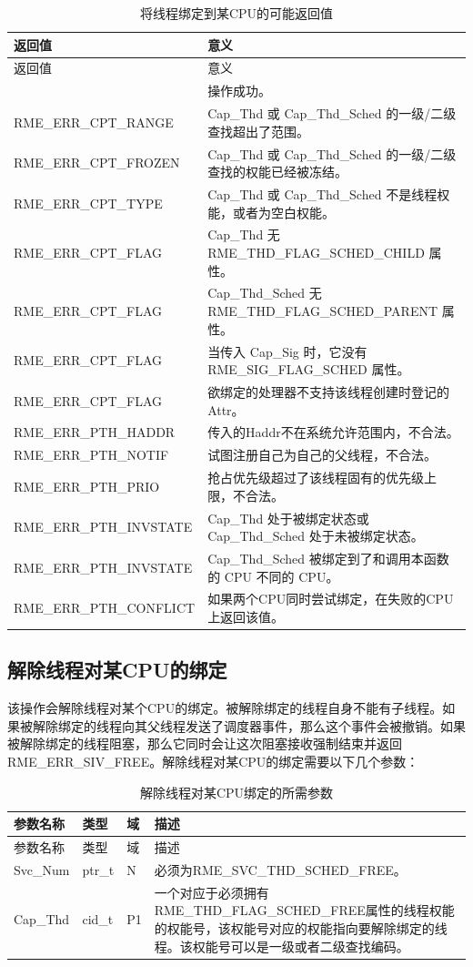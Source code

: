 \begin{xltabular}{\textwidth}{@{}>{\hsize\raggedright\arraybackslash}X>{\hsize\raggedright\arraybackslash}X@{}}
\caption{将线程绑定到某CPU的可能返回值}\label{tab:4-25-bind-thread-to-cpu-return-values}\\
\toprule
返回值 & 意义\tabularnewline
\endfirsthead
\toprule
返回值 & 意义\tabularnewline
\midrule
\endhead
\bottomrule
{} & 操作成功。\tabularnewline
    RME\_ERR\_CPT\_RANGE & Cap\_Thd 或 Cap\_Thd\_Sched 的一级/二级查找超出了范围。\tabularnewline
    RME\_ERR\_CPT\_FROZEN & Cap\_Thd 或 Cap\_Thd\_Sched 的一级/二级查找的权能已经被冻结。\tabularnewline
    RME\_ERR\_CPT\_TYPE & Cap\_Thd 或 Cap\_Thd\_Sched 不是线程权能，或者为空白权能。\tabularnewline
    RME\_ERR\_CPT\_FLAG & Cap\_Thd 无 RME\_THD\_FLAG\_SCHED\_CHILD 属性。\tabularnewline
    RME\_ERR\_CPT\_FLAG & Cap\_Thd\_Sched 无 RME\_THD\_FLAG\_SCHED\_PARENT 属性。\tabularnewline
    RME\_ERR\_CPT\_FLAG & 当传入 Cap\_Sig 时，它没有 RME\_SIG\_FLAG\_SCHED 属性。\tabularnewline
    RME\_ERR\_CPT\_FLAG & 欲绑定的处理器不支持该线程创建时登记的 Attr。\tabularnewline
    RME\_ERR\_PTH\_HADDR & 传入的Haddr不在系统允许范围内，不合法。\tabularnewline
    RME\_ERR\_PTH\_NOTIF & 试图注册自己为自己的父线程，不合法。\tabularnewline
    RME\_ERR\_PTH\_PRIO & 抢占优先级超过了该线程固有的优先级上限，不合法。\tabularnewline
    RME\_ERR\_PTH\_INVSTATE & Cap\_Thd 处于被绑定状态或 Cap\_Thd\_Sched 处于未被绑定状态。\tabularnewline
    RME\_ERR\_PTH\_INVSTATE & Cap\_Thd\_Sched 被绑定到了和调用本函数的 CPU 不同的 CPU。\tabularnewline
    RME\_ERR\_PTH\_CONFLICT & 如果两个CPU同时尝试绑定，在失败的CPU上返回该值。\tabularnewline
\end{xltabular}

\subsection{解除线程对某CPU的绑定}\label{subsec:4-unbind-a-thread-from-a-cpu}

该操作会解除线程对某个CPU的绑定。被解除绑定的线程自身不能有子线程。如果被解除绑定的线程向其父线程发送了调度器事件，那么这个事件会被撤销。如果被解除绑定的线程阻塞，那么它同时会让这次阻塞接收强制结束并返回RME\_ERR\_SIV\_FREE。解除线程对某CPU的绑定需要以下几个参数：

\begin{xltabular}{\textwidth}{@{}>{\hsize\raggedright\arraybackslash}X>{\hsize\raggedright\arraybackslash}X>{\hsize\raggedright\arraybackslash}X>{\hsize\raggedright\arraybackslash}X@{}}
\caption{解除线程对某CPU绑定的所需参数}\label{tab:4-26-unbind-thread-from-cpu-parameters}\\
\toprule
参数名称 & 类型 & 域 & 描述\tabularnewline
\endfirsthead
\toprule
参数名称 & 类型 & 域 & 描述\tabularnewline
\midrule
\endhead
\bottomrule
\endlastfoot
Svc\_Num & ptr\_t & N &
必须为RME\_SVC\_THD\_SCHED\_FREE。\tabularnewline
Cap\_Thd & cid\_t & P1 &
一个对应于必须拥有RME\_THD\_FLAG\_SCHED\_FREE属性的线程权能的权能号，该权能号对应的权能指向要解除绑定的线程。该权能号可以是一级或者二级查找编码。\tabularnewline
\end{xltabular}


